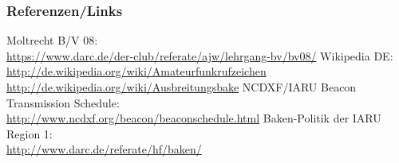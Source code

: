 \renewcommand{\refname}{Referenzen}

\begin{frame}
  \frametitle{Referenzen/Links}
  \hypertarget{refs}{}
  \footnotesize

  \begin{thebibliography}{}
     Moltrecht B/V 08: \\
      \url{https://www.darc.de/der-club/referate/ajw/lehrgang-bv/bv08/}
        Wikipedia DE: \\
      \url{http://de.wikipedia.org/wiki/Amateurfunkrufzeichen} \\
      \url{http://de.wikipedia.org/wiki/Ausbreitungsbake}
       NCDXF/IARU Beacon Transmission Schedule: \\
      \url{http://www.ncdxf.org/beacon/beaconschedule.html}
      Baken-Politik der IARU Region 1: \\
      \url{http://www.darc.de/referate/hf/baken/}
  \end{thebibliography}

\end{frame}


